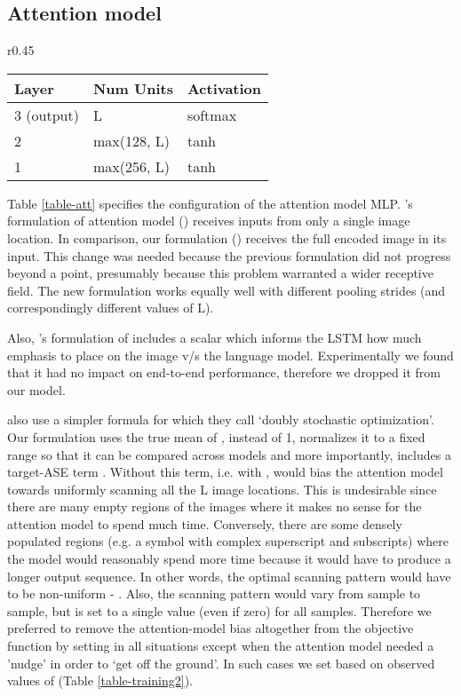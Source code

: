 \documentclass{article}
\begin{document}
\subsection{Attention model}
\label{att-analyses}
\begin{wraptable}{r}{0.45\textwidth}
\caption[Visual Attention MLP]{Specification of the Visual Attention Model MLP. L = 34 for I2L-STRIPS and and 136 for I2L-NOPOOL.}
	\begin{tabular}{lll}
		\textbf{Layer} & \textbf{Num Units} & \textbf{Activation}\\
		\hline
		3 (output) & L & softmax \\
		2 & max(128, L) & tanh \\
		1 & max(256, L) & tanh
	\end{tabular}
	\centering
	\label{table-att}
\end{wraptable}
Table \ref{table-att} specifies the configuration of the attention model MLP. \citealt{Xu2015ShowAA}'s formulation of attention model () receives inputs from only a single image location. In comparison, our formulation () receives the full encoded image  in its input. This change was needed because the previous formulation did not progress beyond a point, presumably because this problem warranted a wider receptive field. The new formulation works equally well with different pooling strides (and correspondingly different values of L).

Also, \citealt{Xu2015ShowAA}'s formulation of  includes a scalar  which informs the LSTM how much emphasis to place on the image v/s the language model. Experimentally we found that it had no impact on end-to-end performance, therefore we dropped it from our model.

\citealt{Xu2015ShowAA} also use a simpler formula for  which they call `doubly stochastic optimization'. Our formulation uses the true mean of ,  instead of 1, normalizes it to a fixed range so that it can be compared across models and more importantly, includes a target-ASE term . Without this term, i.e. with ,  would bias the attention model towards uniformly scanning all the L image locations. This is undesirable since there are many empty regions of the images where it makes no sense for the attention model to spend much time. Conversely, there are some densely populated regions (e.g. a symbol with complex superscript and subscripts) where the model would reasonably spend more time because it would have to produce a longer output sequence. In other words, the optimal scanning pattern would have to be non-uniform - . Also, the scanning pattern would vary from sample to sample, but  is set to a single value (even if zero) for all samples. Therefore we preferred to remove the attention-model bias altogether from the objective function by setting  in all situations except when the attention model needed a 'nudge' in order to `get off the ground'. In such cases we set  based on observed values of  (Table \ref{table-training2}).
\end{document}
